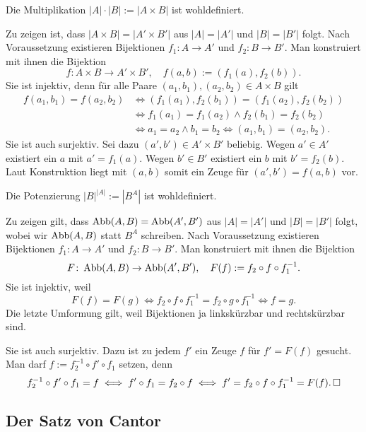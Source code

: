 \begin{Satz}
Die Multiplikation $|A|\cdot |B| := |A\times B|$ ist wohldefiniert.
\end{Satz}
\begin{Beweis}
Zu zeigen ist, dass $|A\times B|=|A'\times B'|$ aus $|A|=|A'|$
und $|B|=|B'|$ folgt. Nach Voraussetzung existieren Bijektionen
$f_1\colon A\to A'$ und $f_2\colon B\to B'$. Man konstruiert mit ihnen
die Bijektion
\[f\colon A\times B\to A'\times B',\quad f(a,b) := (f_1(a),f_2(b)).\]
Sie ist injektiv, denn für alle Paare $(a_1,b_1),(a_2,b_2)\in A\times B$ gilt
\begin{align*}
f(a_1,b_1) = f(a_2,b_2) &\iff (f_1(a_1),f_2(b_1)) = (f_1(a_2), f_2(b_2))\\
&\iff f_1(a_1)=f_1(a_2)\land f_2(b_1)=f_2(b_2)\\
&\iff a_1=a_2\land b_1=b_2\iff (a_1,b_1) = (a_2,b_2).
\end{align*}
Sie ist auch surjektiv. Sei dazu $(a',b')\in A'\times B'$ beliebig.
Wegen $a'\in A'$ existiert ein $a$ mit $a'=f_1(a)$. Wegen $b'\in B'$
existiert ein $b$ mit $b'=f_2(b)$. Laut Konstruktion liegt mit $(a,b)$
somit ein Zeuge für $(a',b')=f(a,b)$ vor.\,\qedsymbol
\end{Beweis}

\begin{Satz}
Die Potenzierung $|B|^{|A|} := |B^A|$ ist wohldefiniert.
\end{Satz}
\begin{Beweis}
Zu zeigen gilt, dass $\operatorname{Abb}(A,B)=\operatorname{Abb}(A',B')$ aus $|A|=|A'|$
und $|B|=|B'|$ folgt, wobei wir $\operatorname{Abb}(A,B)$ statt $B^A$ schreiben.
Nach Voraussetzung existieren Bijektionen $f_1\colon A\to A'$
und $f_2\colon B\to B'$. Man konstruiert mit ihnen die Bijektion
\[F\colon \operatorname{Abb}(A,B)\to\operatorname{Abb}(A',B'),\quad F(f) := f_2\circ f\circ f_1^{-1}.\]
Sie ist injektiv, weil
\[F(f) = F(g) \iff f_2\circ f\circ f_1^{-1} = f_2\circ g\circ f_1^{-1} \iff f = g.\]
Die letzte Umformung gilt, weil Bijektionen ja linkskürzbar und
rechtskürzbar sind.

Sie ist auch surjektiv. Dazu ist zu jedem $f'$ ein Zeuge $f$ für $f' = F(f)$
gesucht. Man darf $f := f_2^{-1}\circ f'\circ f_1$ setzen, denn
\[f_2^{-1}\circ f'\circ f_1  = f\iff  f'\circ f_1 = f_2\circ f
\iff f' = f_2\circ f\circ f_1^{-1} = F(f).\,\Box\]
\end{Beweis}

\subsection{Der Satz von Cantor}

